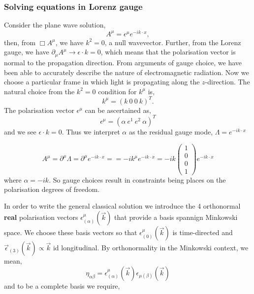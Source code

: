 \subsubsection{Solving equations in Lorenz gauge}
Consider the plane wave solution,
\begin{equation}
    A^{\mu} = \epsilon^{\mu}e^{-ik\cdot x},
\end{equation}
then, from $\Box A^{\mu}$, we have $k^2=0$, a null wavevector. Further, from the Lorenz gauge, we have $\partial_{\mu}A^{\mu} \rightarrow \epsilon\cdot k=0$, which means that the polarisation vector is normal to the propagation direction. From arguments of gauge choice, we have been able to accurately describe the nature of electromagnetic radiation. Now we choose a particular frame in which light is propagating along the $z$-direction. The natural choice from the $k^2=0$ condition for $k^{\mu}$ is, 
\begin{equation}
    k^{\mu} = (k \ 0 \ 0 \ k)^T.
\end{equation}
The polarisation vector $\epsilon^{\mu}$ can be ascertained as, 
\begin{equation}
    \epsilon^{\mu} = (\alpha \ e^1 \ e^2 \ \alpha)^T
\end{equation}
and we see $\epsilon\cdot k = 0$. Thus we interpret $\alpha$ as the residual gauge mode, $\Lambda = e^{-ik\cdot x}$

\begin{equation}
    A^{\mu} = \partial^{\mu}\Lambda = \partial^{\mu}e^{-ik\cdot x} = =-ik^{\mu}e^{-ik\cdot x} = -ik\begin{pmatrix}
        1\\
        0\\
        0\\
        1
    \end{pmatrix}e^{-ik\cdot x}
\end{equation}
where $\alpha = -ik$. So gauge choices result in constraints being places on the polarisation degrees of freedom. 

In order to write the general classical solution we introduce the 4 orthonormal \textbf{real} polarisation vectors $\epsilon^{\mu}_{(\alpha)}(\vec{k})$ that provide a basis spannign Minkowski space. We choose these basis vectors  so that $\epsilon^{\mu}_{(0)}(\vec{k})$ is time-directed and $\vec{\epsilon}_{(3)}(\vec{k})\propto\vec{k}$ id longitudinal. By orthonormality in the Minkowski context, we mean, 
\begin{equation}
    \eta_{\alpha\beta} = \epsilon^{\mu}_{(\alpha)}(\vec{k})\epsilon_{\mu(\beta)}(\vec{k})
\end{equation}
and to be a complete basis we require, 

